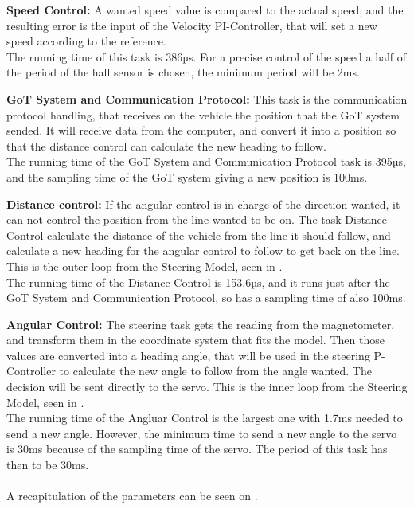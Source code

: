 \textbf{Speed Control:}
A wanted speed value is compared to the actual speed, and the resulting error is the input of the Velocity PI-Controller, that will set a new speed according to the reference.\\
The running time of this task is 386µs. For a precise control of the speed a half of the period of the hall sensor is chosen, the minimum period will be 2ms.


\textbf{GoT System and Communication Protocol:}
This task is the communication protocol handling, that receives on the vehicle the position that the GoT system sended. It will receive data from the computer, and convert it into a position so that the distance control can calculate the new heading to follow.\\
The running time of the GoT System and Communication Protocol task is 395µs, and the sampling time of the GoT system giving a new position is 100ms.

\textbf{Distance control:}
If the angular control is in charge of the direction wanted, it can not control the position from the line wanted to be on. The task Distance Control calculate the distance of the vehicle from the line it should follow, and calculate a new heading for the angular control to follow to get back on the line. This is the outer loop from the Steering Model, seen in .\\
The running time of the Distance Control is 153.6µs, and it runs just after the GoT System and Communication Protocol, so has a sampling time of also 100ms.

\textbf{Angular Control:}
The steering task gets the reading from the magnetometer, and transform them in the coordinate system that fits the model. Then those values are converted into a heading angle, that will be used in the steering P-Controller to calculate the new angle to follow from the angle wanted. The decision will be sent directly to the servo. This is the inner loop from the Steering Model, seen in .\\
The running time of the Angluar Control is the largest one with 1.7ms needed to send a new angle. However, the minimum time to send a new angle to the servo is 30ms because of the sampling time of the servo. The period of this task has then to be 30ms.\\\\


A recapitulation of the parameters can be seen on .

